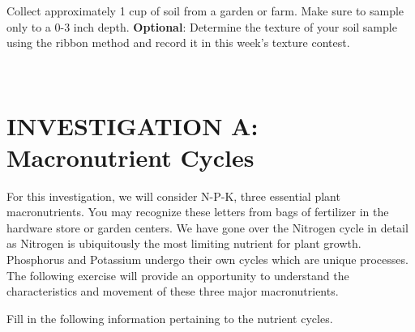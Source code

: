 \documentclass[
  letterpaper,
  twocolumn,
  portrait]{scrbook}
\begin{document}
Collect approximately 1 cup of soil from a garden or farm. Make sure to
sample only to a 0-3 inch depth. \textbf{Optional}: Determine the
texture of your soil sample using the ribbon method and record it in
this week's texture contest.

~

\hypertarget{investigation-a-macronutrient-cycles}{%
\section{INVESTIGATION A: Macronutrient
Cycles}\label{investigation-a-macronutrient-cycles}}

For this investigation, we will consider N-P-K, three essential plant
macronutrients. You may recognize these letters from bags of fertilizer
in the hardware store or garden centers. We have gone over the Nitrogen
cycle in detail as Nitrogen is ubiquitously the most limiting nutrient
for plant growth. Phosphorus and Potassium undergo their own cycles
which are unique processes. The following exercise will provide an
opportunity to understand the characteristics and movement of these
three major macronutrients.

Fill in the following information pertaining to the nutrient cycles.

 
  \providecommand{\huxb}[2]{\arrayrulecolor[RGB]{#1}\global\arrayrulewidth=#2pt}
  \providecommand{\huxvb}[2]{\color[RGB]{#1}\vrule width #2pt}
  \providecommand{\huxtpad}[1]{\rule{0pt}{#1}}
  \providecommand{\huxbpad}[1]{\rule[-#1]{0pt}{#1}}
\end{document}
